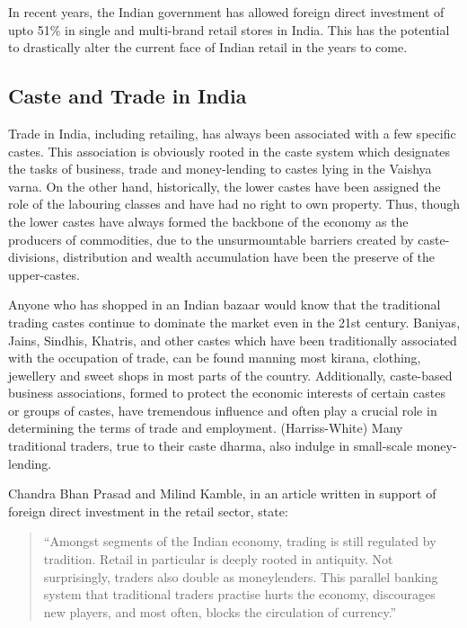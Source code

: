 \documentclass[12pt,a4paper,titlepage]{report}
\begin{document}
In recent years, the Indian government has allowed foreign direct
investment of upto 51\% in single and multi-brand retail stores in
India. This has the potential to drastically alter the current face of
Indian retail in the years to come.

\subsection{Caste and Trade in India}\label{caste-and-trade-in-india}

Trade in India, including retailing, has always been associated with a
few specific castes. This association is obviously rooted in the caste
system which designates the tasks of business, trade and money-lending
to castes lying in the Vaishya varna. On the other hand, historically,
the lower castes have been assigned the role of the labouring classes
and have had no right to own property. Thus, though the lower castes
have always formed the backbone of the economy as the producers of
commodities, due to the unsurmountable barriers created by
caste-divisions, distribution and wealth accumulation have been the
preserve of the upper-castes.

Anyone who has shopped in an Indian bazaar would know that the
traditional trading castes continue to dominate the market even in the
21st century. Baniyas, Jains, Sindhis, Khatris, and other castes which
have been traditionally associated with the occupation of trade, can be
found manning most kirana, clothing, jewellery and sweet shops in most
parts of the country. Additionally, caste-based business associations,
formed to protect the economic interests of certain castes or groups of
castes, have tremendous influence and often play a crucial role in
determining the terms of trade and employment. (Harriss-White) Many
traditional traders, true to their caste dharma, also indulge in
small-scale money-lending.

Chandra Bhan Prasad and Milind Kamble, in an article written in support
of foreign direct investment in the retail sector, state:

\begin{quote}
``Amongst segments of the Indian economy, trading is still regulated by
tradition. Retail in particular is deeply rooted in antiquity. Not
surprisingly, traders also double as moneylenders. This parallel banking
system that traditional traders practise hurts the economy, discourages
new players, and most often, blocks the circulation of currency.''
\end{quote}
\end{document}
